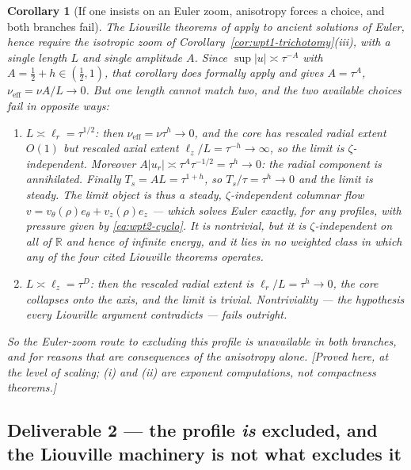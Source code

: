 \documentclass[11pt]{article}
\newtheorem{corollary}[theorem]{Corollary}
\theoremstyle{definition}
\theoremstyle{remark}
\newcommand{\R}{\mathbb{R}}
\newcommand{\abs}[1]{\left|#1\right|}
\begin{document}
\begin{corollary}[If one insists on an Euler zoom, anisotropy forces a
  choice, and both branches fail]\label{cor:wpt2-isotropic-dichotomy}
  The Liouville theorems of \cite{Seregin2024TypeII, Seregin2026Axisym,
  Seregin2026Scenarios, Seregin2026Potential} apply to ancient solutions of
  \emph{Euler}, hence require the isotropic zoom of
  Corollary~\ref{cor:wpt1-trichotomy}(iii), with a single length $L$ and
  single amplitude $A$. Since
  $\sup\abs{u}\asymp\tau^{-A}$ with $A=\tfrac12+h\in(\tfrac12,1)$, that
  corollary does formally apply and gives $A=\tau^{A}$,
  $\nu_{\mathrm{eff}}=\nu A/L\to0$. But one length cannot match two, and the
  two available choices fail in opposite ways:
  \begin{enumerate}[label=\textup{(\roman*)},leftmargin=2.6em]
    \item $L\asymp\ell_r=\tau^{1/2}$: then $\nu_{\mathrm{eff}}=\nu\tau^{h}
      \to0$, and the core has rescaled radial extent $O(1)$ but rescaled
      axial extent $\ell_z/L=\tau^{-h}\to\infty$, so the limit is
      $\zeta$-independent. Moreover $A\abs{u_r}\asymp\tau^{A}\tau^{-1/2}
      =\tau^{h}\to0$: the radial component is annihilated. Finally
      $T_s=AL=\tau^{1+h}$, so $T_s/\tau=\tau^{h}\to0$ and the limit is
      \emph{steady}. The limit object is thus a steady, $\zeta$-independent
      columnar flow $v=v_\theta(\rho)e_\theta+v_z(\rho)e_z$ --- which solves
      Euler exactly, for \emph{any} profiles, with pressure given by
      \eqref{eq:wpt2-cyclo}. It is nontrivial, but it is
      $\zeta$-independent on all of $\R$ and hence of infinite energy, and it
      lies in no weighted class in which any of the four cited Liouville
      theorems operates.
    \item $L\asymp\ell_z=\tau^{D}$: then the rescaled radial extent is
      $\ell_r/L=\tau^{h}\to0$, the core collapses onto the axis, and the
      limit is trivial. Nontriviality --- the hypothesis every Liouville
      argument contradicts --- fails outright.
  \end{enumerate}
  So the Euler-zoom route to excluding this profile is unavailable in both
  branches, and for reasons that are consequences of the anisotropy alone.
  \emph{[Proved here, at the level of scaling; (i) and (ii) are exponent
  computations, not compactness theorems.]}
\end{corollary}

\subsection{Deliverable 2 --- the profile \emph{is} excluded, and the
Liouville machinery is not what excludes it}
\label{subsec:wpt2-exclusion}
\end{document}
